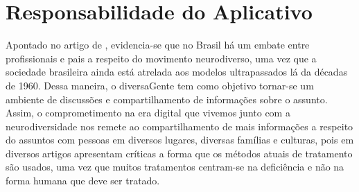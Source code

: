 \section{Responsabilidade do Aplicativo}
Apontado no artigo de \cite{rios}, evidencia-se que no Brasil há um embate entre profissionais e pais a respeito do movimento neurodiverso, uma vez que a sociedade brasileira ainda está atrelada aos modelos ultrapassados lá da décadas de 1960. Dessa maneira, o diversaGente tem como objetivo tornar-se um ambiente de discussões e compartilhamento de informações sobre o assunto. 
Assim, o comprometimento na era digital que vivemos junto com a neurodiversidade nos remete ao compartilhamento de mais informações a respeito do assuntos com pessoas em diversos lugares, diversas famílias e culturas, pois em diversos artigos apresentam críticas a forma que os métodos atuais de tratamento são usados, uma vez que muitos tratamentos centram-se na deficiência e não na forma humana que deve ser tratado. \cite{machado} 

